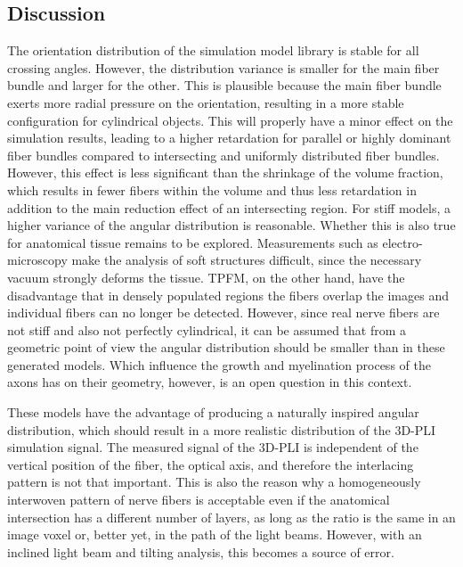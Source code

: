 \subsection{Discussion}
% 
The orientation distribution of the simulation model library is stable for all crossing angles.
However, the distribution variance is smaller for the main fiber bundle and larger for the other.
This is plausible because the main fiber bundle exerts more radial pressure on the orientation, resulting in a more stable configuration for cylindrical objects.
This will properly have a minor effect on the simulation results, leading to a higher retardation for parallel or highly dominant fiber bundles compared to intersecting and uniformly distributed fiber bundles.
However, this effect is less significant than the shrinkage of the volume fraction, which results in fewer fibers within the volume and thus less retardation in addition to the main reduction effect of an intersecting region.
For stiff models, a higher variance of the angular distribution is reasonable.
Whether this is also true for anatomical tissue remains to be explored.
Measurements such as electro-microscopy make the analysis of soft structures difficult, since the\textbf{} necessary vacuum strongly deforms the tissue.
\ac{TPFM}, on the other hand, have the disadvantage that in densely populated regions the fibers overlap the images and individual fibers can no longer be detected.
However, since real nerve fibers are not stiff and also not perfectly cylindrical, it can be assumed that from a geometric point of view the angular distribution should be smaller than in these generated models.
Which influence the growth and myelination process of the axons has on their geometry, however, is an open question in this context.
\par
%
These models have the advantage of producing a naturally inspired angular distribution, which should result in a more realistic distribution of the \ac{3D-PLI} simulation signal.
The measured signal of the \ac{3D-PLI} is independent of the vertical position of the fiber, the optical axis, and therefore the interlacing pattern is not that important.
This is also the reason why a homogeneously interwoven pattern of nerve fibers is acceptable even if the anatomical intersection has a different number of layers, as long as the ratio is the same in an image voxel or, better yet, in the path of the light beams.
However, with an inclined light beam and tilting analysis, this becomes a source of error.
